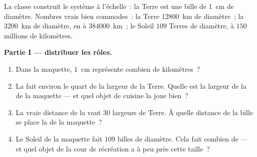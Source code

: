 \begin{problem}\label{pb:g6:sun-earth-moon:1}
La classe construit le système à l'échelle~: la Terre est une bille
de \qty{1}{cm} de diamètre. Nombres vrais bien commodes~: la Terre
\qty{12800}{km} de diamètre~; la  \qty{3200}{km} de diamètre, en
 à \qty{384000}{km}~; le Soleil $109$ Terres de diamètre, à
$150$ millions de kilomètres.

\medskip\noindent\textbf{Partie I --- distribuer les rôles.}
\begin{enumerate}
  \item Dans la maquette, \qty{1}{cm} représente combien de
        kilomètres~?
  \item La  fait environ le quart de la largeur de la Terre.
        Quelle est la largeur de la  de la maquette --- et quel
        objet de cuisine la joue bien~?
  \item La vraie distance de la  vaut $30$ largeurs de Terre. À
        quelle distance de la bille se place la  de la
        maquette~?
  \item Le Soleil de la maquette fait $109$ billes de diamètre.
        Cela fait combien de  --- et quel objet de la
        cour de récréation a à peu près cette taille~?
\end{enumerate}


\end{problem}
